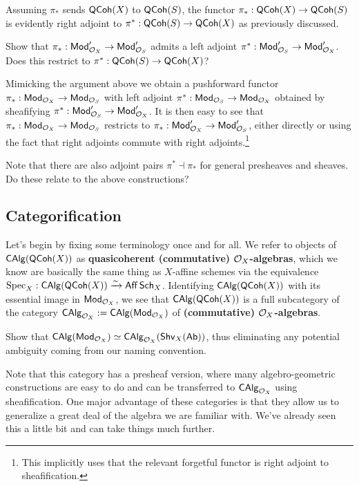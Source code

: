 \documentclass[11pt]{article}
\begin{document}
Assuming $\pi_*$ sends $\QCoh(X)$ to $\QCoh(S)$, the functor $\pi_*: \QCoh(X)\to\QCoh(S)$ is evidently right adjoint to $\pi^*: \QCoh(S)\to\QCoh(X)$ as previously discussed. 

\begin{exercise}
Show that $\pi_*: \Mod'_{\O_X}\to\Mod'_{\O_S}$ admits a left adjoint $\pi^*: \Mod'_{\O_S}\to\Mod'_{\O_X}$. Does this restrict to $\pi^*: \QCoh(S)\to\QCoh(X)$?
\end{exercise}

Mimicking the argument above we obtain a pushforward functor $\pi_*: \Mod_{\O_X}\to\Mod_{\O_S}$ with left adjoint $\pi^*: \Mod_{\O_S}\to\Mod_{\O_X}$ obtained by sheafifying $\pi^*: \Mod'_{\O_S}\to\Mod'_{\O_X}$. It is then easy to see that $\pi_*: \Mod_{\O_X}\to\Mod_{\O_S}$ restricts to $\pi_*: \Mod'_{\O_X}\to\Mod'_{\O_S}$, either directly or using the fact that right adjoints commute with right adjoints.\footnote{This implicitly uses that the relevant forgetful functor is right adjoint to sheafification.}

\begin{exercise}
Note that there are also adjoint pairs $\pi^*\dashv\pi_*$ for general presheaves and sheaves. Do these relate to the above constructions?
\end{exercise}

\subsection{Categorification}
Let's begin by fixing some terminology once and for all. We refer to objects of $\CAlg(\QCoh(X))$ as \textbf{quasicoherent (commutative) $\O_X$-algebras}, which we know are basically the same thing as $X$-affine schemes via the equivalence $\Spec_X: \CAlg(\QCoh(X))\xto{\sim}\Aff\Sch_X$. Identifying $\CAlg(\QCoh(X))$ with its essential image in $\Mod_{\O_X}$, we see that $\CAlg(\QCoh(X))$ is a full subcategory of the category $\CAlg_{\O_X}:=\CAlg(\Mod_{\O_X})$ of \textbf{(commutative) $\O_X$-algebras}.

\begin{exercise}
Show that $\CAlg(\Mod_{\O_X})\simeq\CAlg_{\O_X}(\Shv_X(\Ab))$, thus eliminating any potential ambiguity coming from our naming convention.
\end{exercise}

Note that this category has a presheaf version, where many algebro-geometric constructions are easy to do and can be transferred to $\CAlg_{\O_X}$ using sheafification. One major advantage of these categories is that they allow us to generalize a great deal of the algebra we are familiar with. We've already seen this a little bit and can take things much further.
\end{document}
